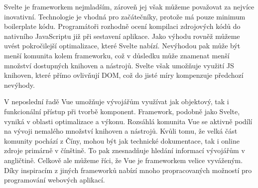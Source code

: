Svelte je frameworkem nejmladším, zároveň jej však můžeme považovat za nejvíce inovativní. 
Technologie je vhodná pro začátečníky, protože má pouze minimum boilerplate kódu. 
Programátoři rozhodně ocení kompilaci zdrojových kódů do nativního JavaScriptu již při sestavení aplikace. 
Jako výhodu rovněž můžeme uvést pokročilejší optimalizace, které Svelte nabízí. 
Nevýhodou pak může být menší komunita kolem frameworku, což v důsledku může znamenat menší množství dostupných knihoven a nástrojů. 
Svelte však umožňuje využití JS knihoven, které přímo ovlivňují DOM, což do jisté míry kompenzuje předchozí nevýhody.

V neposlední řadě Vue umožňuje vývojářům využívat jak objektový, tak i funkcionální přístup při tvorbě komponent. 
Framework, podobně jako Svelte, vyniká v oblasti optimalizace a výkonu. Rozsáhlá komunita Vue se aktivně podílí na vývoji nemalého množství knihoven a nástrojů. 
Kvůli tomu, že velká část komunity pochází z Číny, mohou být jak technické dokumentace, tak i online zdroje primárně v čínštině. 
To pak znesnadňuje hledání informací vývojářům v angličtině. Celkově ale můžeme říci, že Vue je frameworkem velice vyváženým. 
Díky inspiracím z jiných frameworků nabízí mnoho propracovaných možností pro programování webových aplikací.